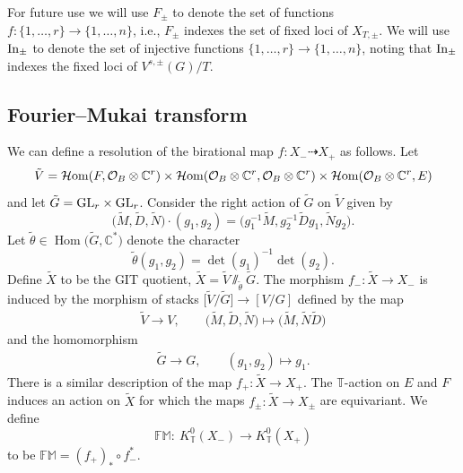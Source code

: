 \documentclass[pdftex]{sigma}
\numberwithin{equation}{section}
\newcommand{\cc}[1]{\mathcal{#1}} %
\newcommand{\CC}{\mathbb{C}}
\newcommand{\torus}{\mathbb{T}}
\newcommand{\FM}{\mathbb{FM}}
\DeclareMathOperator{\Hom}{Hom}
\newcommand{\F}{F}
\newcommand{\E}{E}
\begin{document}
For future use we will use $F_\pm$ to denote the set of functions $f\colon \{1, \dots, r\} \to \{1, \dots, n\}$, i.e., $F_\pm$ indexes the set of fixed loci of $X_{T, \pm}$. We will use ${\rm In}_\pm$ to denote the set of injective functions $\{1, \dots, r\} \to \{1, \dots, n\}$, noting that ${\rm In}_\pm$ indexes the fixed loci of $V^{s, \pm}(G)/T.$



\subsection{Fourier--Mukai transform}\label{s:FM}
We can define a resolution of the birational map
$f\colon X_{-} \dashrightarrow X_{+}$
as follows. Let
\[
\tilde V = \mathcal{H}{\rm om}(\F, \cc O_B \otimes \CC^r) \times \mathcal{H}{\rm om}(\cc O_B \otimes \CC^r, \cc O_B \otimes \CC^r) \times \mathcal{H}{\rm om}(\cc O_B \otimes \CC^r, \E)
\]
and let $\tilde G = {\rm GL}_r \times {\rm GL}_r$. Consider the right action of $\tilde G$ on $\tilde V$ given by
\[
\bigl(\tilde M, \tilde D, \tilde N\bigr) \cdot (g_1, g_2)= \bigl( g_1^{-1}\tilde M , g_2^{-1}\tilde D g_1, \tilde Ng_2\bigr).
\]
Let $\tilde \theta \in \Hom\bigl(\tilde G, \CC^*\bigr)$ denote the character
\[
\tilde \theta(g_1, g_2) = \det(g_1)^{-1} \det(g_2).
\]
Define $\tilde X$ to be the GIT quotient,
$\tilde X = \tilde V \sslash_{\tilde \theta} \tilde G$.
The morphism $f_{-}\colon \tilde X \to X_{-}$ is induced by the morphism of stacks
$\bigl[\tilde V/\tilde G\bigr] \to [V/G]$
defined by the map
\begin{align*}
 \tilde V \to V, \qquad
 \bigl(\tilde M, \tilde D, \tilde N\bigr) \mapsto \bigl(\tilde M, \tilde N \tilde D\bigr)
\end{align*}
and the homomorphism
\begin{align*}
 \tilde G \to G ,\qquad
 (g_1, g_2) \mapsto g_1.
\end{align*}
There is a similar description of the map $f_{+}\colon \tilde X \to X_{+}.$
The $\torus$-action on $E$ and $F$ induces an action on $\tilde X$ for which the maps $f_\pm\colon \tilde X \to X_\pm$ are equivariant. We define
\begin{equation}\label{Kmap}
\FM\colon \ K^0_\torus(X_{-}) \to K^0_\torus(X_{+})
\end{equation}
to be $\FM = (f_{+})_* \circ f_{-}^*.$
\end{document}
